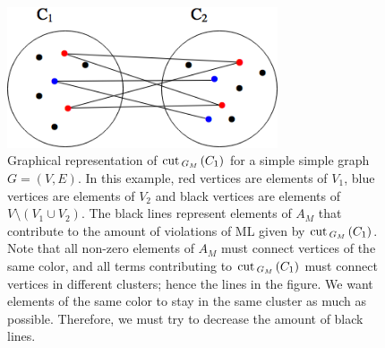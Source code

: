 \begin{figure}
\begin{center}
\includegraphics[width=8cm]{figures/gm.png}
\end{center}
   \caption[Graphical representation of $\cut_{G_M\,}(C_1)$ for a simple graph $G=(V,E)$]{Graphical representation of $\cut _{G_M\,}(C_1)$ for a simple simple graph $G = (V,E)$.  In this example, red vertices are elements of $V_1$, blue vertices are elements of $V_2$ and black vertices are elements of $V \setminus (V_1 \cup V_2)$. The black lines represent elements of $A_M$ that contribute to the amount of violations of ML given by $\cut _{G_M\,}(C_1)$. Note that all non-zero elements of $A_M$ must connect vertices of the same color, and all terms contributing to $\cut _{G_M\,}(C_1)$ must connect vertices in different clusters; hence the lines in the figure. We want elements of the same color to stay in the same cluster as much as possible. Therefore, we must try to decrease the amount of black lines.}
\label{gm}
\end{figure}

